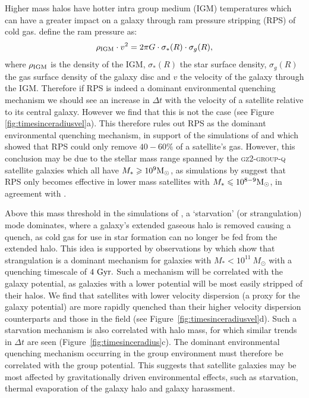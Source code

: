 \documentclass[useAMS,usenatbib]{mn2e}
\begin{document}
Higher mass halos have hotter intra group medium (IGM) temperatures \citep{shimizu03, delpopolo05} which can have a greater impact on a galaxy through ram pressure stripping (RPS) of cold gas. \cite{gunngott72} define the ram pressure as:
\begin{equation}\label{eq:rps}
\rho_{\rm{IGM}}\cdot v^2 = 2\pi G \cdot \sigma_*(R) \cdot \sigma_g(R),
\end{equation}
where $\rho_{\rm{IGM}}$ is the density of the IGM, $\sigma_*(R)$ the star surface density, $\sigma_g(R)$ the gas surface density of the galaxy disc and $v$ the velocity of the galaxy through the IGM. Therefore if RPS is indeed a dominant environmental quenching mechanism we should see an increase in $\Delta t$ with the velocity of a satellite relative to its central galaxy.  However we find that this is not the case (see Figure \ref{fig:timesinceradiusvel}a). This therefore rules out RPS as the dominant environmental quenching mechanism, in support of the simulations of \citet{emerick16} and \citet{fillingham16} which showed that RPS could only remove $40-60\%$ of a satellite's gas. However, this conclusion may be due to the stellar mass range spanned by the \textsc{gz2-group-q} satellite galaxies which all have $M_* \geq 10^9 \rm{M}_{\odot}$, as simulations by \cite{fillingham16} suggest that RPS only becomes effective in lower mass satellites with $M_* \leq 10^{8-9} \rm{M}_{\odot}$, in agreement with \cite{hester06}. 

Above this mass threshold in the simulations of \cite{fillingham16}, a `starvation' (or strangulation) mode \citep{larson80, balogh00} dominates, where a galaxy's extended gaseous halo is removed causing a quench, as cold gas for use in star formation can no longer be fed from the extended halo. This idea is supported by observations by \citet{peng10} which show that strangulation is a dominant mechanism for galaxies with $M_* < 10^{11}~M_{\odot}$ with a quenching timescale of $4~\rm{Gyr}.$ Such a mechanism will be correlated with the galaxy potential, as galaxies with a lower potential will be most easily stripped of their halos. We find that satellites with lower velocity dispersion (a proxy for the galaxy potential) are more rapidly quenched than their higher velocity dispersion counterparts and those in the field (see Figure~\ref{fig:timesinceradiusvel}d). Such a starvation mechanism is also correlated with halo mass, for which similar trends in $\Delta t$ are seen (Figure~\ref{fig:timesinceradius}c). The dominant environmental quenching mechanism occurring in the group environment must therefore be correlated with the group potential. This suggests that satellite galaxies may be most affected by gravitationally driven environmental effects, such as starvation, thermal evaporation of the galaxy halo and galaxy harassment. 
\end{document}
